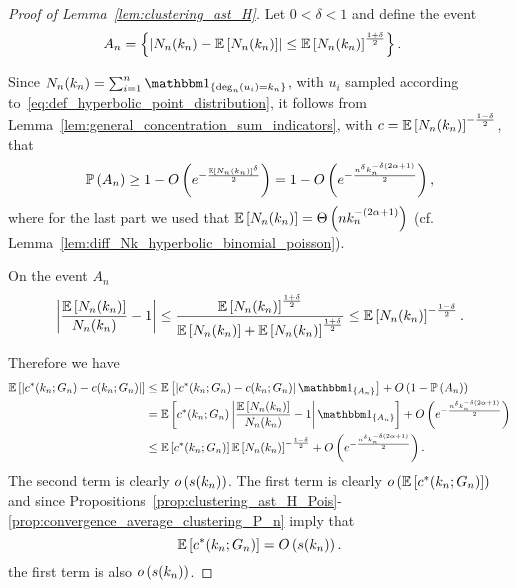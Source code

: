 \begin{proof}[Proof of Lemma~\ref{lem:clustering_ast_H}]
Let $0 < \delta < 1$ and define the event
\begin{align*}
	A_n &= \left\{\left|N_n(k_n) - \mathbb{E}\left[N_n(k_n)\right]\right| \le \mathbb{E}\left[N_n(k_n)\right]^{\frac{1 + \delta}{2}}\right\}.
\end{align*}

Since $N_n(k_n) = \sum_{i = 1}^n \ind{\mathrm{deg}_n(u_i) = k_n}$, with $u_i$ sampled according to~\eqref{eq:def_hyperbolic_point_distribution}, it follows from Lemma~\ref{lem:general_concentration_sum_indicators}, with $c = \mathbb{E}\left[N_{n}(k_n)\right]^{-\frac{1-\delta}{2}}$, that
\begin{equation}\label{eq:clustering_ast_H_prob_A}
	\mathbb{P}\left(A_n\right) \ge 1 - O\left(e^{-\frac{\mathbb{E}\left[N_{n}(k_n)\right]^\delta}{2}}\right) = 1 - O\left(e^{-\frac{n^\delta k_n^{-\delta(2\alpha + 1)}}{2}}\right),
\end{equation}
where for the last part we used that $\mathbb{E}\left[N_n(k_n)\right] = \Theta\left(n k_n^{-(2\alpha + 1)}\right)$ (cf. Lemma~\ref{lem:diff_Nk_hyperbolic_binomial_poisson}).

On the event $A_n$
\[
	\left|\frac{\mathbb{E}\left[N_{n}(k_n)\right]}{N_{n}(k_n)} - 1\right| 
	\le \frac{\mathbb{E}\left[N_{n}(k_n)\right]^{\frac{1 + \delta}{2}}}{\mathbb{E}\left[N_{n}(k_n)\right]+\mathbb{E}\left[N_{n}(k_n)\right]^{\frac{1 + \delta}{2}}}
	\le \mathbb{E}\left[N_{n}(k_n)\right]^{-\frac{1 - \delta}{2}}.
\]

Therefore we have
\begin{align*}
	\Exp{\left|c^\ast(k_n; G_n) - c(k_n; G_n)\right|}
	&\le \Exp{\left|c^\ast(k_n; G_n) - c(k_n; G_n)\right|\ind{A_n}} + \bigO{1 - \Prob{A_n}}\\
	&= \Exp{c^\ast(k_n; G_n)\left|\frac{\Exp{N_{n}(k_n)}}{N_{n}(k_n)} - 1\right|\ind{A_n}}
		+ \bigO{e^{-\frac{n^\delta k_n^{-\delta(2\alpha + 1)}}{2}}}\\
	&\le \Exp{c^\ast(k_n; G_n)}\Exp{N_{n}(k_n)}^{-\frac{1 - \delta}{2}} 
		+ \bigO{e^{-\frac{n^\delta k_n^{-\delta(2\alpha + 1)}}{2}}}.
\end{align*}
The second term is clearly $o\left(s(k_n)\right)$. The first term is clearly $o\left(\mathbb{E}\left[c^\ast(k_n; G_n)\right]\right)$ and since Propositions~\ref{prop:clustering_ast_H_Pois}-\ref{prop:convergence_average_clustering_P_n} imply that
\[
	\mathbb{E}\left[c^\ast(k_n; G_n)\right] = O\left(s(k_n)\right).
\] 
the first term is also $o\left(s(k_n)\right)$.
\end{proof}









